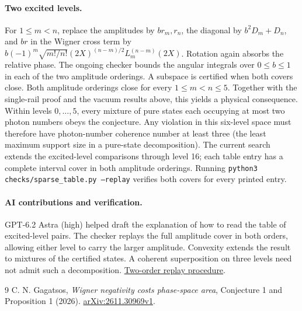 \documentclass[11pt]{article}
\begin{document}
\paragraph{Two excited levels.}
For $1\le m<n$, replace the amplitudes by $br_m,r_n$, the diagonal by $b^2D_m+D_n$, and $br$ in the Wigner cross term by $b(-1)^m\sqrt{m!/n!}(2X)^{(n-m)/2}L_m^{(n-m)}(2X)$. Rotation again absorbs the relative phase. The ongoing checker bounds the angular integrals over $0\le b\le1$ in each of the two amplitude orderings. A subspace is certified when both covers close. Both amplitude orderings close for every $1\le m<n\le 5$. Together with the single-rail proof and the vacuum results above, this yields a physical consequence. Within levels $0,\ldots,5$, every mixture of pure states each occupying at most two photon numbers obeys the conjecture. Any violation in this six-level space must therefore have photon-number coherence number at least three (the least maximum support size in a pure-state decomposition). The current search extends the excited-level comparisons through level 16; each table entry has a complete interval cover in both amplitude orderings. Running \texttt{python3 checks/sparse\_table.py --replay} verifies both covers for every printed entry.

\paragraph{AI contributions and verification.} GPT-6.2 Astra (high) helped draft the explanation of how to read the table of excited-level pairs. The checker replays the full amplitude cover in both orders, allowing either level to carry the larger amplitude. Convexity extends the result to mixtures of the certified states. A coherent superposition on three levels need not admit such a decomposition. \href{https://github.com/shunyaekam/oo-research/blob/a5cde30636afbfe599efab6bf8bbbafe9c640c22/checks/sparse_table.py}{Two-order replay procedure}.

\begin{thebibliography}{9}
 C. N. Gagatsos, \emph{Wigner negativity costs phase-space area}, Conjecture 1 and Proposition 1 (2026). \href{https://arxiv.org/abs/2611.30969}{arXiv:2611.30969v1}.
\end{thebibliography}
\end{document}
